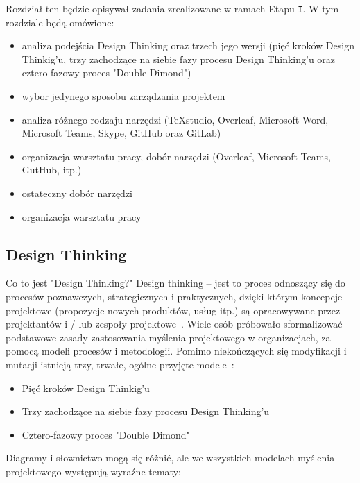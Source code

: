 \documentclass[a4paper,titleauthor]{mwart}
\begin{document}
	Rozdział ten będzie opisywał zadania zrealizowane w ramach Etapu \texttt{I}. W tym rozdziale będą omówione:
	
	\begin{itemize}
		\item analiza podejścia Design Thinking oraz trzech jego wersji (pięć kroków Design Thinkig'u, trzy zachodzące na siebie fazy procesu Design Thinking'u oraz cztero-fazowy proces "Double Dimond")
		\item wybor jedynego sposobu zarządzania projektem
		\item analiza różnego rodzaju narzędzi (TeXstudio, Overleaf, Microsoft Word, Microsoft Teams, Skype, GitHub oraz GitLab)
		\item organizacja warsztatu pracy, dobór narzędzi (Overleaf, Microsoft Teams, GutHub, itp.)
		\item ostateczny dobór narzędzi
		\item organizacja warsztatu pracy
	\end{itemize}
	
	\subsection{Design Thinking}
	\label{sec:design_thinking}
	Co to jest "Design Thinking?" \newline
	\newline
	Design thinking – jest to proces odnoszący się do procesów poznawczych, strategicznych i praktycznych, dzięki którym koncepcje projektowe (propozycje nowych produktów, usług itp.) są opracowywane przez projektantów i / lub zespoły projektowe~\cite{DesignThinking1}. \newline \newline Wiele osób próbowało sformalizować podstawowe zasady zastosowania myślenia projektowego w organizacjach, za pomocą modeli procesów i metodologii. Pomimo niekończących się modyfikacji i mutacji istnieją trzy, trwałe, ogólne przyjęte modele~\cite{DesignThinking2}:
	
	\begin{itemize}
		\item Pięć kroków Design Thinkig'u
		\item Trzy zachodzące na siebie fazy procesu Design Thinking'u
		\item Cztero-fazowy proces "Double Dimond"
	\end{itemize}
	
	Diagramy i słownictwo mogą się różnić, ale we wszystkich modelach myślenia projektowego występują wyraźne tematy:
	
\end{document}
